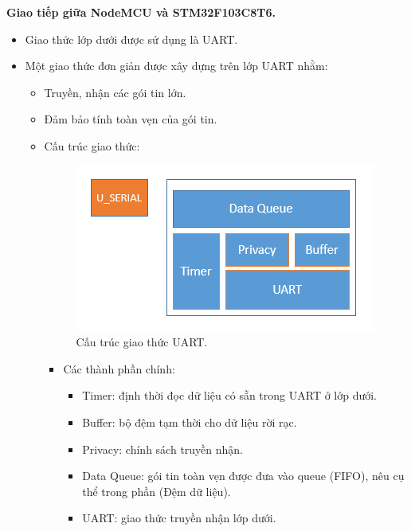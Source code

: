 \documentclass[a4paper,12pt,oneside]{article}
\begin{document}
\noindent	\textbf{Giao tiếp giữa NodeMCU và STM32F103C8T6.}
	\begin{itemize}
	\item  Giao thức lớp dưới được sử dụng là UART.
	\item	Một giao thức đơn giản được xây dựng trên lớp UART nhằm:
		\begin{itemize}
		\item	Truyền, nhận các gói tin lớn.
		\item	Đảm bảo tính toàn vẹn của gói tin.
		\item Cấu trúc giao thức:
			\begin{center}
			\begin{figure}[h!]
			\begin{center}
			\includegraphics[scale=.6]{hinh/uart_protocol.PNG}
			\end{center}
			\caption{Cấu trúc giao thức UART.}
			\end{figure}
			\end{center}
		  \begin{itemize}
		  \item	Các thành phần chính:
		  	\begin{itemize}
		  		\item	Timer: định thời đọc dữ liệu có sẵn trong UART ở lớp dưới.
				\item	Buffer: bộ đệm tạm thời cho dữ liệu rời rạc.
				\item	Privacy: chính sách truyền nhận.
				\item	Data Queue: gói tin toàn vẹn được đưa vào queue (FIFO), nêu cụ thể trong phần (Đệm dữ liệu). 
				\item	UART: giao thức truyền nhận lớp dưới.
		  	\end{itemize}
		  	

\end{itemize}
\end{itemize}
\end{itemize}
\end{document}
